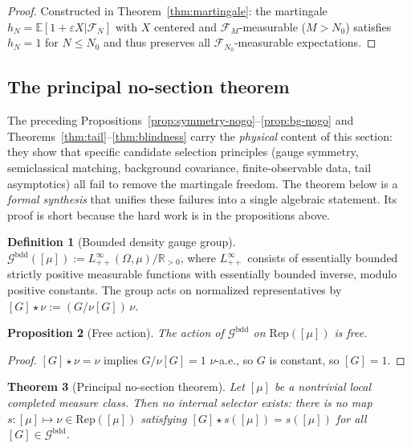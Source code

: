 \documentclass[12pt,a4paper]{article}
\theoremstyle{plain}
\newtheorem{theorem}{Theorem}[section]
\newtheorem{proposition}[theorem]{Proposition}
\theoremstyle{definition}
\newtheorem{definition}[theorem]{Definition}
\theoremstyle{remark}
\newcommand{\cF}{\mathcal{F}}
\newcommand{\cG}{\mathcal{G}}
\newcommand{\E}{\mathbb{E}}
\newcommand{\R}{\mathbb{R}}
\newcommand{\Rep}{\mathrm{Rep}}
\begin{document}
\begin{proof}
Constructed in Theorem~\ref{thm:martingale}: the martingale
$h_N = \E[1+\varepsilon X|\cF_N]$ with $X$ centered and
$\cF_M$-measurable ($M > N_0$) satisfies $h_N = 1$ for $N \le N_0$
and thus preserves all $\cF_{N_0}$-measurable expectations.
\end{proof}

\subsection{The principal no-section theorem}

The preceding Propositions~\ref{prop:symmetry-nogo}--\ref{prop:bg-nogo}
and Theorems~\ref{thm:tail}--\ref{thm:blindness} carry the
\emph{physical} content of this section: they show that specific
candidate selection principles (gauge symmetry, semiclassical matching,
background covariance, finite-observable data, tail asymptotics) all
fail to remove the martingale freedom.  The theorem below is a
\emph{formal synthesis} that unifies these failures into a single
algebraic statement.  Its proof is short because the hard work is in
the propositions above.

\begin{definition}[Bounded density gauge group]
\label{def:gauge-group}
$\cG^{\mathrm{bdd}}([\mu]) :=
L^\infty_{++}(\Omega,\mu)/\R_{>0}$, where $L^\infty_{++}$
consists of essentially bounded strictly positive measurable functions
with essentially bounded inverse, modulo positive constants.  The
group acts on normalized representatives by
$[G] \star \nu := (G/\nu[G])\,\nu$.
\end{definition}

\begin{proposition}[Free action]
\label{prop:free-action}
The action of $\cG^{\mathrm{bdd}}$ on $\Rep([\mu])$ is free.
\end{proposition}

\begin{proof}
$[G]\star\nu = \nu$ implies $G/\nu[G] = 1$ $\nu$-a.e., so $G$ is
constant, so $[G] = 1$.
\end{proof}

\begin{theorem}[Principal no-section theorem]
\label{thm:no-section}
Let $[\mu]$ be a nontrivial local completed measure class.  Then no
\emph{internal selector} exists: there is no map
$s\colon [\mu] \mapsto \nu \in \Rep([\mu])$ satisfying
$[G]\star s([\mu]) = s([\mu])$ for all $[G] \in \cG^{\mathrm{bdd}}$.
\end{theorem}
\end{document}
